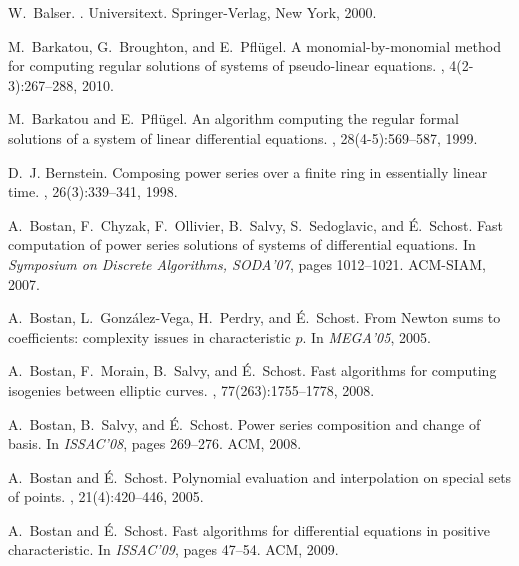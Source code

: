 \documentclass[]{sig-alternate}
\begin{document}
\scriptsize

\begin{thebibliography}{10}
\vspace{0.2cm}
W.~Balser.
.
\newblock Universitext. Springer-Verlag, New York, 2000.

M.~Barkatou, G.~Broughton, and E.~Pfl{\"u}gel.
\newblock A monomial-by-monomial method for computing regular solutions of
  systems of pseudo-linear equations.
, 4(2-3):267--288, 2010.

M.~Barkatou and E.~Pfl{\"u}gel.
\newblock An algorithm computing the regular formal solutions of a system of
  linear differential equations.
, 28(4-5):569--587, 1999.

D.~J. Bernstein.
\newblock Composing power series over a finite ring in essentially linear time.
, 26(3):339--341, 1998.

A.~Bostan, F.~Chyzak, F.~Ollivier, B.~Salvy, S.~Sedoglavic, and {\'E}.~Schost.
\newblock Fast computation of power series solutions of systems of differential
  equations.
\newblock In {\em Symposium on Discrete Algorithms, SODA'07}, pages 1012--1021.
  ACM-SIAM, 2007.

A.~Bostan, L.~Gonz{\'a}lez-Vega, H.~Perdry, and {\'E}.~Schost.
\newblock From {N}ewton sums to coefficients: complexity issues in
  characteristic $p$.
\newblock In {\em MEGA'05}, 2005.

A.~Bostan, F.~Morain, B.~Salvy, and {\'E}.~Schost.
\newblock Fast algorithms for computing isogenies between elliptic curves.
, 77(263):1755--1778, 2008.

A.~Bostan, B.~Salvy, and {\'E}.~Schost.
\newblock Power series composition and change of basis.
\newblock In {\em ISSAC'08}, pages 269--276. ACM, 2008.

A.~Bostan and {\'E}.~Schost.
\newblock Polynomial evaluation and interpolation on special sets of points.
, 21(4):420--446, 2005.

A.~Bostan and {\'E}.~Schost.
\newblock Fast algorithms for differential equations in positive
  characteristic.
\newblock In {\em ISSAC'09}, pages 47--54. ACM, 2009.


\end{thebibliography}
\end{document}

